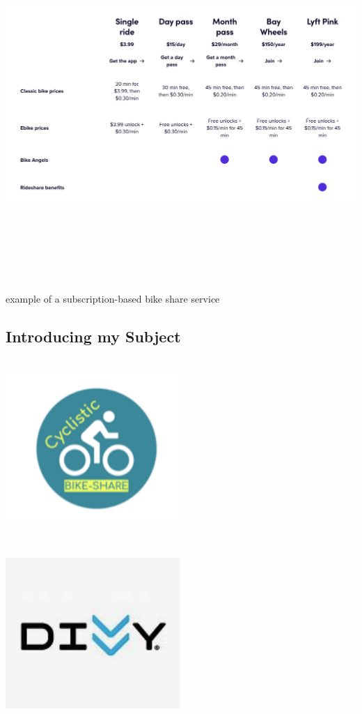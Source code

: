 \documentclass[
]{article}
\begin{document}
\includegraphics[width=1500px,height=500px]{BikeShareSubscription}

\small example of a subscription-based bike share service

\subsection{Introducing my Subject}\label{introducing-my-subject}

\includegraphics[width=250px,height=250px]{Cyclistic}

\includegraphics[width=250px,height=250px]{Divvy}
\end{document}
